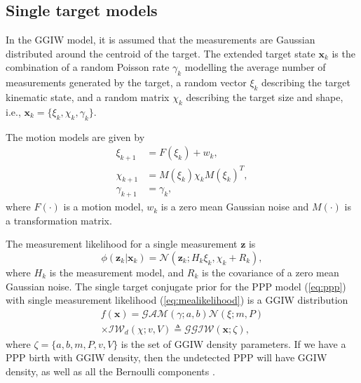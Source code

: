\documentclass[journal]{IEEEtran}
\begin{document}

\subsection{Single target models}
In the GGIW model, it is assumed that the measurements are Gaussian distributed around the centroid of the target. The extended target state $\mathbf{x}_k$ is the combination of a random Poisson rate $\gamma_k$ modelling the average number of measurements generated by the target, a random vector $\xi_k$ describing the target kinematic state, and a random matrix $\chi_k$ describing the target size and shape, i.e., $\mathbf{x}_k=\{\xi_{k},\chi_{k},\gamma_{k}\}$.

The motion models are given by
\begin{subequations}
\begin{align}
    \xi_{k+1} &= F(\xi_k) + w_k,\\
    \chi_{k+1} &= M(\xi_k)\chi_kM(\xi_k)^T,\\
    \gamma_{k+1} &= \gamma_k,
\end{align}
\end{subequations}
where $F(\cdot)$ is a motion model, $w_k$ is a zero mean Gaussian noise and $M(\cdot)$ is a transformation matrix. 

The measurement likelihood for a single measurement $\mathbf{z}$ is
\begin{equation}
    \phi(\mathbf{z}_k|\mathbf{x}_k) = \mathcal{N}(\mathbf{z}_k;H_k\xi_k,\chi_k+R_k),
    \label{eq:mealikelihood}
\end{equation}
where $H_k$ is the measurement model, and $R_k$ is the covariance of a zero mean Gaussian noise. The single target conjugate prior for the PPP model (\ref{eq:ppp}) with single measurement
likelihood (\ref{eq:mealikelihood}) is a GGIW distribution \cite{randomMatrix,randomMatrix2}
\begin{multline}
f(\mathbf{x}) = \mathcal{GAM}(\gamma;a,b)\mathcal{N}(\xi;m,P)\\ \times\mathcal{IW}_d(\chi;v,V) \triangleq \mathcal{GGIW}(\mathbf{x};\zeta),
\end{multline}
where $\zeta = \{a,b,m,P,v,V\}$ is the set of GGIW density parameters. If we have a PPP birth with GGIW density, then the undetected PPP will have GGIW density, as well as all the Bernoulli components \cite{pmbmextended2}.
\end{document}
